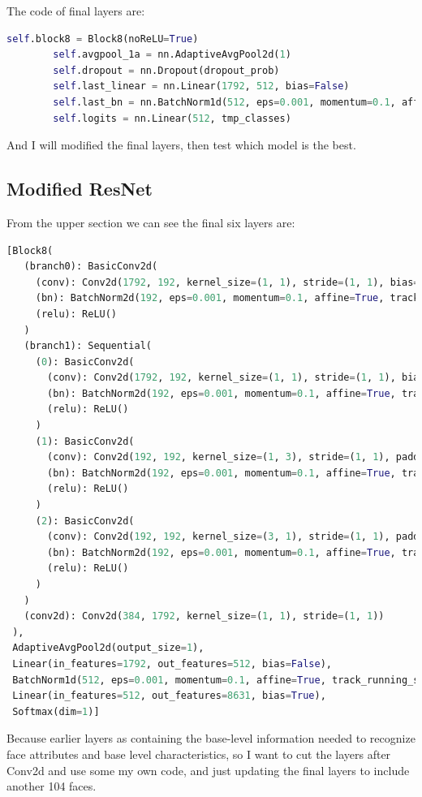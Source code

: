 \documentclass{article}
\begin{document}
The code of final layers are:
\begin{lstlisting}[language=Python, caption=Final layer Codes]
        self.block8 = Block8(noReLU=True)
        self.avgpool_1a = nn.AdaptiveAvgPool2d(1)
        self.dropout = nn.Dropout(dropout_prob)
        self.last_linear = nn.Linear(1792, 512, bias=False)
        self.last_bn = nn.BatchNorm1d(512, eps=0.001, momentum=0.1, affine=True)
        self.logits = nn.Linear(512, tmp_classes)
\end{lstlisting}
And I will modified the final layers, then test which model is the best.

\subsection{Modified ResNet}
From the upper section we can see the final six layers are:
\begin{lstlisting}[language=Python, caption=Final layers]
[Block8(
   (branch0): BasicConv2d(
     (conv): Conv2d(1792, 192, kernel_size=(1, 1), stride=(1, 1), bias=False)
     (bn): BatchNorm2d(192, eps=0.001, momentum=0.1, affine=True, track_running_stats=True)
     (relu): ReLU()
   )
   (branch1): Sequential(
     (0): BasicConv2d(
       (conv): Conv2d(1792, 192, kernel_size=(1, 1), stride=(1, 1), bias=False)
       (bn): BatchNorm2d(192, eps=0.001, momentum=0.1, affine=True, track_running_stats=True)
       (relu): ReLU()
     )
     (1): BasicConv2d(
       (conv): Conv2d(192, 192, kernel_size=(1, 3), stride=(1, 1), padding=(0, 1), bias=False)
       (bn): BatchNorm2d(192, eps=0.001, momentum=0.1, affine=True, track_running_stats=True)
       (relu): ReLU()
     )
     (2): BasicConv2d(
       (conv): Conv2d(192, 192, kernel_size=(3, 1), stride=(1, 1), padding=(1, 0), bias=False)
       (bn): BatchNorm2d(192, eps=0.001, momentum=0.1, affine=True, track_running_stats=True)
       (relu): ReLU()
     )
   )
   (conv2d): Conv2d(384, 1792, kernel_size=(1, 1), stride=(1, 1))
 ),
 AdaptiveAvgPool2d(output_size=1),
 Linear(in_features=1792, out_features=512, bias=False),
 BatchNorm1d(512, eps=0.001, momentum=0.1, affine=True, track_running_stats=True),
 Linear(in_features=512, out_features=8631, bias=True),
 Softmax(dim=1)]
\end{lstlisting}
Because earlier layers as containing the base-level information needed to recognize face attributes and base level characteristics, so I want to cut the layers after Conv2d and use some my own code, and just updating the final layers to include another 104 faces.
\end{document}
